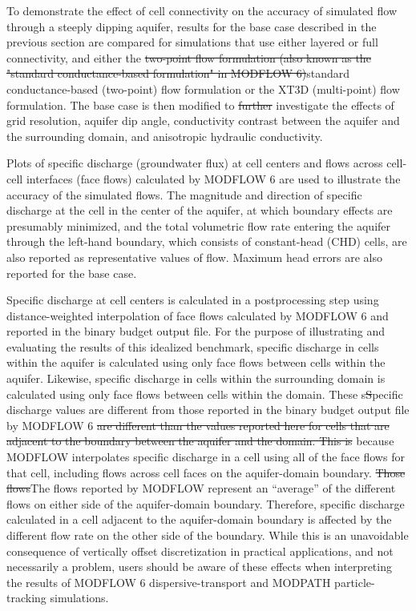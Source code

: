 \documentclass{article}
\begin{document}
To demonstrate the effect of cell connectivity on the accuracy of simulated flow through a steeply dipping aquifer, results for the base case described in the previous section are compared for simulations that use either layered or full connectivity, and either the {\color{red} \sout{two-point flow formulation (also known as the "standard conductance-based formulation" in MODFLOW 6)}standard conductance-based (two-point) flow formulation} or the XT3D {\color{red}(multi-point)} flow formulation. The base case is then modified to {\color{red} \sout{further}} investigate the effects of grid resolution, aquifer dip angle, conductivity contrast between the aquifer and the surrounding domain, and anisotropic hydraulic conductivity.

Plots of specific discharge (groundwater flux) at cell centers and flows across cell-cell interfaces (face flows) calculated by MODFLOW 6 are used to illustrate the accuracy of the simulated flows. The magnitude and direction of specific discharge at the cell in the center of the aquifer, at which boundary effects are presumably minimized, and the total volumetric flow rate entering the aquifer through the left-hand boundary, which consists of constant-head (CHD) cells, are also reported as representative values of flow. Maximum head errors are also reported for the base case.

Specific discharge at cell centers is calculated in a postprocessing step using distance-weighted interpolation of face flows calculated by MODFLOW 6 and reported in the binary budget output file. For the purpose of illustrating and evaluating the results of this idealized benchmark, specific discharge in cells within the aquifer is calculated using only face flows between cells within the aquifer. Likewise, specific discharge in cells within the surrounding domain is calculated using only face flows between cells within the domain. {\color{red} These s\sout{S}}pecific discharge values {\color{red} are different from those} reported in the binary budget output file by MODFLOW 6 {\color{red} \sout{are different than the values reported here for cells that are adjacent to the boundary between the aquifer and the domain. This is }}because MODFLOW interpolates specific discharge in a cell using all of the face flows for that cell, including flows across cell faces on the aquifer-domain boundary. {\color{red} \sout{Those flows}The flows reported by MODFLOW} represent an ``average'' of the different flows on either side of the aquifer-domain boundary. Therefore, specific discharge calculated in a cell adjacent to the aquifer-domain boundary is affected by the different flow rate on the other side of the boundary. While this is an unavoidable consequence of vertically offset discretization in practical applications, and not necessarily a problem, users should be aware of these effects when interpreting the results of MODFLOW 6 dispersive-transport and MODPATH particle-tracking simulations.
\end{document}
